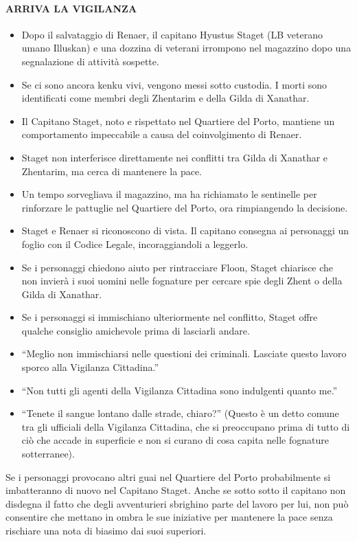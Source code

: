 \documentclass{article}
\begin{document}
                \paragraph{ARRIVA LA VIGILANZA}
                \begin{itemize}
                    \item Dopo il salvataggio di Renaer, il capitano Hyustus Staget (LB veterano umano Illuskan) e una dozzina di veterani irrompono nel magazzino dopo una segnalazione di attività sospette.
                    \item Se ci sono ancora kenku vivi, vengono messi sotto custodia. I morti sono identificati come membri degli Zhentarim e della Gilda di Xanathar.
                    \item Il Capitano Staget, noto e rispettato nel Quartiere del Porto, mantiene un comportamento impeccabile a causa del coinvolgimento di Renaer.
                    \item Staget non interferisce direttamente nei conflitti tra Gilda di Xanathar e Zhentarim, ma cerca di mantenere la pace.
                    \item Un tempo sorvegliava il magazzino, ma ha richiamato le sentinelle per rinforzare le pattuglie nel Quartiere del Porto, ora rimpiangendo la decisione.
                    \item Staget e Renaer si riconoscono di vista. Il capitano consegna ai personaggi un foglio con il Codice Legale, incoraggiandoli a leggerlo.
                    \item Se i personaggi chiedono aiuto per rintracciare Floon, Staget chiarisce che non invierà i suoi uomini nelle fognature per cercare spie degli Zhent o della Gilda di Xanathar.
                    \item Se i personaggi si immischiano ulteriormente nel conflitto, Staget offre qualche consiglio amichevole prima di lasciarli andare.
                \end{itemize}
\begin{itemize}
    \item “Meglio non immischiarsi nelle questioni dei criminali.
    Lasciate questo lavoro sporco alla Vigilanza Cittadina.”
    \item “Non tutti gli agenti della Vigilanza Cittadina sono
    indulgenti quanto me.”
    \item “Tenete il sangue lontano dalle strade, chiaro?” (Questo è
    un detto comune tra gli ufficiali della Vigilanza Cittadina,
    che si preoccupano prima di tutto di ciò che accade in
    superficie e non si curano di cosa capita nelle fognature
    sotterranee).
\end{itemize}

Se i personaggi provocano altri guai nel Quartiere del
Porto probabilmente si imbatteranno di nuovo nel Capitano
Staget. Anche se sotto sotto il capitano non disdegna il fatto
che degli avventurieri sbrighino parte del lavoro per lui,
non può consentire che mettano in ombra le sue iniziative
per mantenere la pace senza rischiare una nota di biasimo
dai suoi superiori.
 
\end{document}

